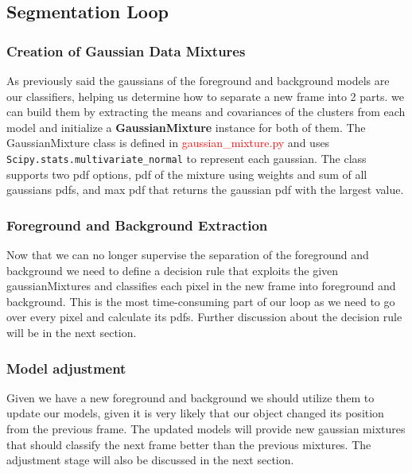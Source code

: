 \subsection{Segmentation Loop}\label{subsec: segment-loop}
\subsubsection{Creation of Gaussian Data Mixtures}\label{subsubsec:gaussians}
As previously said the gaussians of the foreground and background models are our classifiers, helping us determine how to separate a new frame into 2 parts.
we can build them by extracting the means and covariances of the clusters from each model and initialize a \textbf{GaussianMixture} instance for both of them.
The GaussianMixture class is defined in \textcolor{red}{gaussian\_mixture.py} and uses \texttt{Scipy.stats.multivariate\_normal} to represent each gaussian.
The class supports two pdf options, pdf of the mixture using weights and sum of all gaussians pdfs, and max pdf that returns the gaussian pdf with the largest value.

\subsubsection{Foreground and Background Extraction}\label{subsubsec: fg-bg-extract}
Now that we can no longer supervise the separation of the foreground and background we need to define a decision rule
that exploits the given gaussianMixtures and classifies each pixel in the new frame into foreground and background.
This is the most time-consuming part of our loop as we need to go over every pixel and calculate its pdfs.
Further discussion about the decision rule will be in the next section.

\subsubsection{Model adjustment}\label{subsubsec:model-adjust}
Given we have a new foreground and background we should utilize them to update our models, given it is very likely that our object changed its position from the previous frame.
The updated models will provide new gaussian mixtures that should classify the next frame better than the previous mixtures.
The adjustment stage will also be discussed in the next section.
\pagebreak

